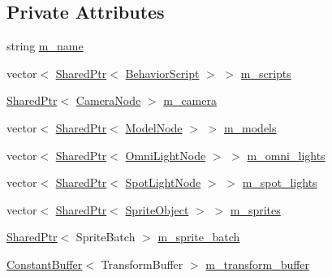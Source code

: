 \subsection*{Private Attributes}
\begin{DoxyCompactItemize}
\item 
string \hyperlink{classmage_1_1_scene_a6cc8cb08b1853c4e3063b33a94e8fb47}{m\+\_\+name}
\item 
vector$<$ \hyperlink{namespacemage_a1e01ae66713838a7a67d30e44c67703e}{Shared\+Ptr}$<$ \hyperlink{classmage_1_1_behavior_script}{Behavior\+Script} $>$ $>$ \hyperlink{classmage_1_1_scene_a84548bf6978f8955ce5892cb23536a4e}{m\+\_\+scripts}
\item 
\hyperlink{namespacemage_a1e01ae66713838a7a67d30e44c67703e}{Shared\+Ptr}$<$ \hyperlink{classmage_1_1_camera_node}{Camera\+Node} $>$ \hyperlink{classmage_1_1_scene_a39c785951d9fb99477c1894eabba0cc6}{m\+\_\+camera}
\item 
vector$<$ \hyperlink{namespacemage_a1e01ae66713838a7a67d30e44c67703e}{Shared\+Ptr}$<$ \hyperlink{classmage_1_1_model_node}{Model\+Node} $>$ $>$ \hyperlink{classmage_1_1_scene_a01132a667fbc1517f11ae561bc221071}{m\+\_\+models}
\item 
vector$<$ \hyperlink{namespacemage_a1e01ae66713838a7a67d30e44c67703e}{Shared\+Ptr}$<$ \hyperlink{namespacemage_a1724c6e6b6b5ba535cdd967cbbb4a669}{Omni\+Light\+Node} $>$ $>$ \hyperlink{classmage_1_1_scene_a881c3dd7e85e5069650f29fd2722bf78}{m\+\_\+omni\+\_\+lights}
\item 
vector$<$ \hyperlink{namespacemage_a1e01ae66713838a7a67d30e44c67703e}{Shared\+Ptr}$<$ \hyperlink{namespacemage_aeed5dee4ff6c591eabb0e9114256df4a}{Spot\+Light\+Node} $>$ $>$ \hyperlink{classmage_1_1_scene_a4e1954bc0b812d6a71123ca3ac9eeb75}{m\+\_\+spot\+\_\+lights}
\item 
vector$<$ \hyperlink{namespacemage_a1e01ae66713838a7a67d30e44c67703e}{Shared\+Ptr}$<$ \hyperlink{classmage_1_1_sprite_object}{Sprite\+Object} $>$ $>$ \hyperlink{classmage_1_1_scene_a7379b399f02999f89f6ccda5bfa01b02}{m\+\_\+sprites}
\item 
\hyperlink{namespacemage_a1e01ae66713838a7a67d30e44c67703e}{Shared\+Ptr}$<$ Sprite\+Batch $>$ \hyperlink{classmage_1_1_scene_a7a334e1b7764532817f10efbc0b91a82}{m\+\_\+sprite\+\_\+batch}
\item 
\hyperlink{structmage_1_1_constant_buffer}{Constant\+Buffer}$<$ Transform\+Buffer $>$ \hyperlink{classmage_1_1_scene_a2e57c981725d0a64bfc8f82381ac3d6a}{m\+\_\+transform\+\_\+buffer}
\item 

\end{DoxyCompactItemize}
